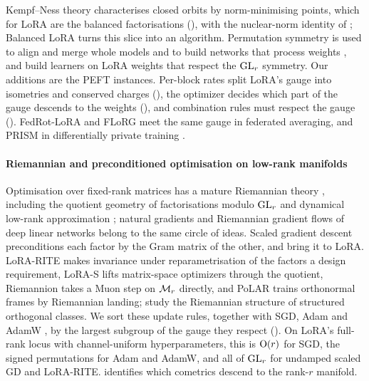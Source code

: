 Kempf--Ness theory \citep{xkempf1979length,xrichardson1990minimum} characterises closed orbits by norm-minimising points, which for LoRA are the balanced factorisations (), with the nuclear-norm identity of \citet{xsrebro2004maximum}; Balanced LoRA \citep{castin2026balanced} turns this slice into an algorithm. Permutation symmetry is used to align and merge whole models \citep{ainsworth2022git,xentezari2022role,xsingh2020model} and to build networks that process weights \citep{xnavon2023equivariant,xzhou2023permutation}, and \citet{putterman2024learning} build learners on LoRA weights that respect the $\mathrm{GL}_r$ symmetry. Our additions are the PEFT instances. Per-block rates split LoRA's gauge into isometries and conserved charges (), the optimizer decides which part of the gauge descends to the weights (), and combination rules must respect the gauge (). FedRot-LoRA \citep{zhang2026fedrot} and FLoRG \citep{meng2026florg} meet the same gauge in federated averaging, and PRISM \citep{wang2026prism} in differentially private training \citep{xabadi2016deep}.

\paragraph{Riemannian and preconditioned optimisation on low-rank manifolds}
Optimisation over fixed-rank matrices has a mature Riemannian theory \citep{xabsil2008optimization,xvandereycken2013low}, including the quotient geometry of factorisations modulo $\mathrm{GL}_r$ \citep{mishra2012fixed,xmishra2016riemannian} and dynamical low-rank approximation \citep{xkoch2010dynamical}; natural gradients \citep{xamari1998natural} and Riemannian gradient flows of deep linear networks \citep{xbah2022learning} belong to the same circle of ideas. Scaled gradient descent \citep{xtong2021accelerating} preconditions each factor by the Gram matrix of the other, and \citet{zhang2024riemannian} bring it to LoRA. LoRA-RITE \citep{yen2024lora} makes invariance under reparametrisation of the factors a design requirement, LoRA-S \citep{zheng2025lora} lifts matrix-space optimizers through the quotient, Riemannion \citep{bogachev2025lora} takes a Muon step \citep{xjordan2024muon} on $\mathcal{M}_r$ directly, and PoLAR \citep{lion2025polar} trains orthonormal frames by Riemannian landing; \citet{aliev2026riemannian} study the Riemannian structure of structured orthogonal classes. We sort these update rules, together with SGD, Adam \citep{xkingma2015adam} and AdamW \citep{xloshchilov2019decoupled}, by the largest subgroup of the gauge they respect (). On LoRA's full-rank locus with channel-uniform hyperparameters, this is $\mathrm{O}(r)$ for SGD, the signed permutations for Adam and AdamW, and all of $\mathrm{GL}_r$ for undamped scaled GD and LoRA-RITE.  identifies which cometrics descend to the rank-$r$ manifold.

